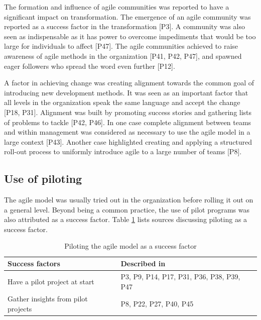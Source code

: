 
The formation and influence of agile communities was reported to have a
significant impact on transformation.
The emergence of an agile community was reported as a success factor in the
transformation [P3]. A community was also seen as indispensable as it has power
to overcome impediments that would be too large for individuals to affect [P47].
The agile communities achieved to raise awareness of agile methods in the
organization [P41, P42, P47], and spawned eager followers who spread the word
even further [P12].


A factor in achieving change was creating alignment towards the common goal of
introducing new development methods. It was seen as an important factor that all
levels in the organization speak the same language and accept the change [P18,
P31]. Alignment was built by promoting success stories and gathering lists of
problems to tackle [P42, P46]. In one case complete alignment between teams and
within management was considered as necessary to use the agile model in a large
context [P43]. Another case highlighted creating and applying a structured
roll-out process to uniformly introduce agile to a large number of teams [P8].


\subsection{Use of piloting}

The agile model was usually tried out in the organization before rolling it out
on a general level. Beyond being a common practice, the use of pilot programs
was also attributed as a success factor. Table \ref{table:success_pilots} lists
sources discussing piloting as a success factor.

\begin{table}[h]
    \centering
    \begin{tabular}{ >{\raggedright\arraybackslash}p{}
                     >{\raggedright\arraybackslash}p{} }
        \toprule
        Success factors  &  Described in \\
        \midrule
        Have a pilot project at start  &
                P3, P9, P14, P17, P31, P36, P38, P39, P47  \\
        Gather insights from pilot projects  &
                P8, P22, P27, P40, P45  \\
        \bottomrule
    \end{tabular}
    \caption{Piloting the agile model as a success factor}
    \label{table:success_pilots}
\end{table}

